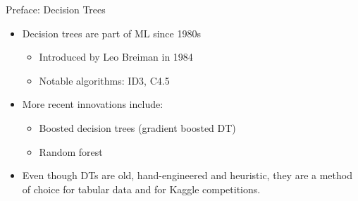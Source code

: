 \begin{frame}{Preface: Decision Trees}
    \begin{itemize}
        \item Decision trees are part of ML since 1980s
        \begin{itemize}
            \item Introduced by Leo Breiman in 1984
            \item Notable algorithms: ID3, C4.5
        \end{itemize}
        \item More recent innovations include:
        \begin{itemize}
            \item Boosted decision trees (gradient boosted DT)
            \item Random forest
        \end{itemize}
        \item Even though DTs are old, hand-engineered and heuristic, they are a method of choice for tabular data and for Kaggle competitions.
    \end{itemize}
\end{frame}


